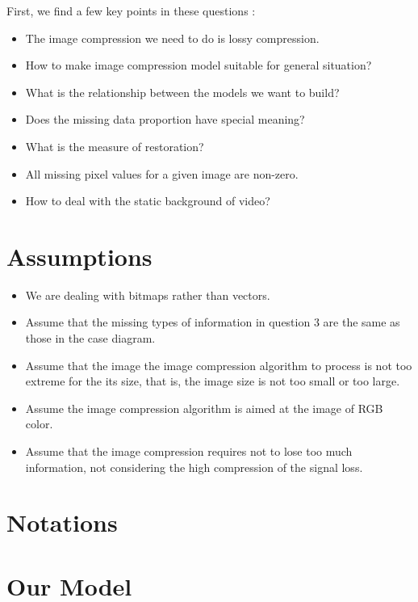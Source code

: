 \documentclass{mcmthesis}
\begin{document}
First, we find a few key points in these questions :
\begin{itemize}
  \item The image compression we need to do is lossy compression.
  \item How to make image compression model suitable for general situation?
  \item What is the relationship between the models we want to build?
  \item Does the missing data proportion have special meaning?
  \item What is the measure of restoration?
  \item All missing pixel values for a given image are non-zero.
  \item How to deal with the static background of video?
\end{itemize}

\section{Assumptions}
\begin{itemize}
  \item We are dealing with bitmaps rather than vectors.
  \item Assume that the missing types of information in question 3 are the same as those in the case diagram.
  \item Assume that the image the image compression algorithm to process is not too extreme for the its size, that is, the image size is not too small or too large.
  \item Assume the image compression algorithm is aimed at the image of RGB color.
  \item Assume that the image compression requires not to lose too much information, not considering the high compression of the signal loss.
\end{itemize}

\section{Notations}

\section{Our Model}
\end{document}
